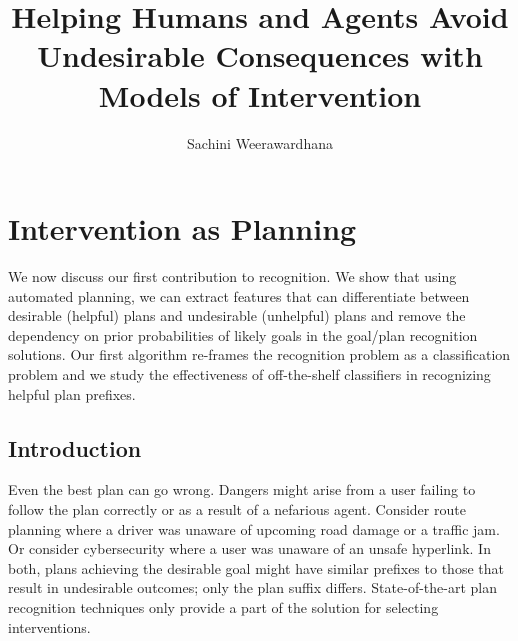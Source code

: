 \documentclass[doctor]{thesis} %
\title{Helping Humans and Agents Avoid Undesirable Consequences with Models of Intervention}
\author{Sachini Weerawardhana}
\theoremstyle{plain}
\begin{document}
\frontmatter %
\maketitle              %
%
%
%
%
\tableofcontents    %
\listoftables       %
\listoffigures      %
\mainmatter %




\chapter{Intervention as Planning}
We now discuss our first contribution to recognition.
We show that using automated planning, we can extract features that can differentiate between desirable (helpful) plans and undesirable (unhelpful) plans and remove the dependency on prior probabilities of likely goals in the goal/plan recognition solutions. Our first algorithm re-frames the recognition problem as a classification problem and we study the effectiveness of off-the-shelf classifiers in recognizing helpful plan prefixes.


\section*{Introduction}
\label{sec:intro}
Even the best plan can go wrong.
Dangers might arise from a user failing to follow the plan correctly or as a result of a nefarious agent.
Consider route planning where a driver was unaware of upcoming road damage or a traffic jam.  
Or consider cybersecurity where a user was unaware of an unsafe hyperlink.
In both, plans achieving the desirable goal might have similar prefixes to those that result in undesirable outcomes; only the plan suffix differs.
State-of-the-art plan recognition techniques only provide a part of the solution for selecting interventions.
\end{document}

